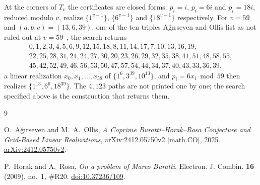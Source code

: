 \documentclass[11pt]{amsart}
\theoremstyle{remark}
\begin{document}
At the corners of $T_v$ the certificates are closed forms: $p_i=i$,
$p_i=6i$ and $p_i=18i$, reduced modulo $v$, realize $\{1^{v-1}\}$,
$\{6^{v-1}\}$ and $\{18^{v-1}\}$ respectively.  For $v=59$ and
$(a,b,c)=(13,6,39)$, one of
the ten triples A\u{g}{\i}rseven and Ollis list as not ruled out at
$v=59$~\cite[Section~5]{AO}, the search returns
\[
  \begin{array}{l}
  0, 1, 2, 3, 4, 5, 6, 9, 12, 15, 18, 8, 11, 14, 17, 7, 10, 13, 16, 19,\\
  22, 25, 28, 31, 21, 24, 27, 30, 20, 23, 26, 29, 32, 35, 38, 41, 51, 48, 58, 55,\\
  45, 42, 52, 49, 46, 56, 53, 50, 47, 57, 54, 44, 34, 37, 40, 43, 33, 36, 39,
  \end{array}
\]
a linear realization $x_0,x_1,\ldots,x_{58}$ of $\{1^{6},3^{39},10^{13}\}$,
and $p_i=6x_i \bmod 59$ then realizes $\{1^{13},6^{6},18^{39}\}$.  The
$4{,}123$ paths are not printed one by one; the search specified above is the
construction that returns them.

\begin{thebibliography}{9}

O.~A\u{g}{\i}rseven and M.~A.~Ollis,
\emph{A Coprime Buratti--Horak--Rosa Conjecture and Grid-Based Linear
Realizations}, arXiv:2412.05750v2 [math.CO], 2025.
\href{https://arxiv.org/abs/2412.05750v2}{arXiv:2412.05750v2}.

P.~Horak and A.~Rosa,
\emph{On a problem of Marco Buratti},
Electron. J. Combin. \textbf{16} (2009), no.~1, \#R20.
\href{https://doi.org/10.37236/109}{doi:10.37236/109}.

\end{thebibliography}
\end{document}
